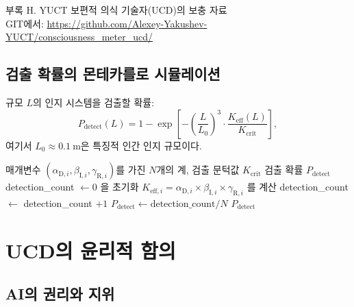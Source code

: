 \documentclass[11pt,a4paper]{article}
\newcommand{\eff}{\mathrm{eff}}
\newcommand{\Ke}{K_{\eff}}
\newcommand{\Kcrit}{K_{\mathrm{crit}}}
\begin{document}
	부록 H. YUCT 보편적 의식 기술자(UCD)의 보충 자료 \\ GIT에서: \url{https://github.com/Alexey-Yakushev-YUCT/consciousness_meter_ucd/}
	
	\subsection{검출 확률의 몬테카를로 시뮬레이션}
	
	규모 \(L\)의 인지 시스템을 검출할 확률:
	\[
	P_{\mathrm{detect}}(L) = 1 - \exp\!\left[-\left(\frac{L}{L_0}\right)^3 \cdot \frac{\Ke(L)}{\Kcrit}\right],
	\]
	여기서 \(L_0 \approx 0.1~\mathrm{m}\)은 특징적 인간 인지 규모이다.
	
	\begin{algorithm}
		\caption{인지 시스템 검출의 몬테카를로 시뮬레이션}
		\begin{algorithmic}[1]
			\Require 매개변수 \((\alpha_{\mathrm{D},i}, \beta_{\mathrm{I},i}, \gamma_{\mathrm{R},i})\)를 가진 \(N\)개의 계, 검출 문턱값 \(\Kcrit\)
			\Ensure 검출 확률 \(P_{\mathrm{detect}}\)
			\State detection\_count \(\gets 0\) 을 초기화
			\State \(K_{\eff,i} = \alpha_{\mathrm{D},i} \times \beta_{\mathrm{I},i} \times \gamma_{\mathrm{R},i}\) 를 계산
			\If{\(K_{\eff,i} > \Kcrit\)}
			\State detection\_count \(\gets\) detection\_count \(+ 1\)
			\EndIf
			\EndFor
			\State \(P_{\mathrm{detect}} \gets \text{detection\_count} / N\)
			\Return \(P_{\mathrm{detect}}\)
		\end{algorithmic}
	\end{algorithm}
	
	\section{UCD의 윤리적 함의}
	
	\subsection{AI의 권리와 지위}
	
\end{document}
